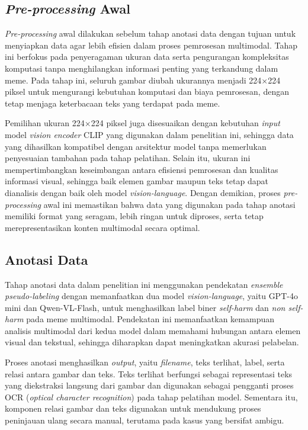 \subsection{\textit{Pre-processing} Awal} \label{subsec:preprocessing_awal}
\textit{Pre-processing} awal dilakukan sebelum tahap anotasi data dengan tujuan untuk menyiapkan data agar lebih efisien dalam proses pemrosesan multimodal. Tahap ini berfokus pada penyeragaman ukuran data serta pengurangan kompleksitas komputasi tanpa menghilangkan informasi penting yang terkandung dalam meme. Pada tahap ini, seluruh gambar diubah ukurannya menjadi 224$\times$224 piksel untuk mengurangi kebutuhan komputasi dan biaya pemrosesan, dengan tetap menjaga keterbacaan teks yang terdapat pada meme.

Pemilihan ukuran 224$\times$224 piksel juga disesuaikan dengan kebutuhan \textit{input} model \textit{vision encoder} CLIP yang digunakan dalam penelitian ini, sehingga data yang dihasilkan kompatibel dengan arsitektur model tanpa memerlukan penyesuaian tambahan pada tahap pelatihan. Selain itu, ukuran ini mempertimbangkan keseimbangan antara efisiensi pemrosesan dan kualitas informasi visual, sehingga baik elemen gambar maupun teks tetap dapat dianalisis dengan baik oleh model \textit{vision-language}. Dengan demikian, proses \textit{pre-processing} awal ini memastikan bahwa data yang digunakan pada tahap anotasi memiliki format yang seragam, lebih ringan untuk diproses, serta tetap merepresentasikan konten multimodal secara optimal.

\subsection{Anotasi Data} \label{subsec:anotasi_data}
Tahap anotasi data dalam penelitian ini menggunakan pendekatan \textit{ensemble pseudo-labeling} dengan memanfaatkan dua model \textit{vision-language}, yaitu GPT-4o mini dan Qwen-VL-Flash, untuk menghasilkan label biner \textit{self-harm} dan \textit{non self-harm} pada meme multimodal. Pendekatan ini memanfaatkan kemampuan analisis multimodal dari kedua model dalam memahami hubungan antara elemen visual dan tekstual, sehingga diharapkan dapat meningkatkan akurasi pelabelan.

Proses anotasi menghasilkan \textit{output}, yaitu \textit{filename}, teks terlihat, label, serta relasi antara gambar dan teks. Teks terlihat berfungsi sebagai representasi teks yang diekstraksi langsung dari gambar dan digunakan sebagai pengganti proses OCR (\textit{optical character recognition}) pada tahap pelatihan model. Sementara itu, komponen relasi gambar dan teks digunakan untuk mendukung proses peninjauan ulang secara manual, terutama pada kasus yang bersifat ambigu.

